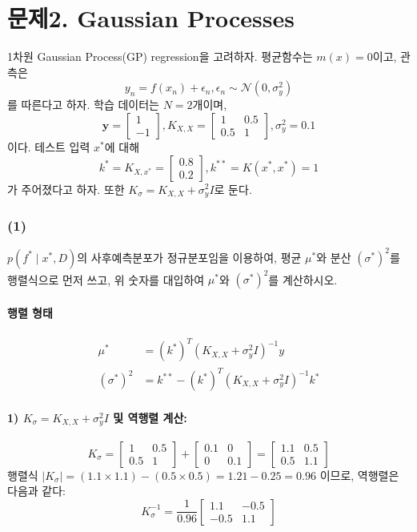 \documentclass[11pt]{article}
\begin{document}

\section*{문제2. Gaussian Processes}
1차원 Gaussian Process(GP) regression을 고려하자. 평균함수는 $m(x)=0$이고, 관측은
\[ y_n = f(x_n)+\epsilon_n, \epsilon_n \sim \mathcal{N}(0, \sigma_y^2)\]
를 따른다고 하자. 학습 데이터는 $N=2$개이며,
\[ \mathbf{y}= \begin{bmatrix} 1 \\ -1\end{bmatrix}, K_{X, X}=\begin{bmatrix} 1 & 0.5\\ 0.5 & 1\end{bmatrix}, \sigma_y^2=0.1\]
이다. 테스트 입력 $x^*$에 대해
\[ k^* = K_{X, x^*} = \begin{bmatrix} 0.8 \\ 0.2\end{bmatrix}, k^{**} = K(x^*, x^*)=1\]
가 주어졌다고 하자. 또한 $K_\sigma=K_{X, X}+\sigma_y^2I$로 둔다.

\subsubsection*{(1)}
$p(f^* \mid x^*, D)$의 사후예측분포가 정규분포임을 이용하여, 평균 $\mu^*$와 분산 $(\sigma^*)^2$를 행렬식으로 먼저 쓰고, 위 숫자를 대입하여 $\mu^*$와 $(\sigma^*)^2$를 계산하시오.
\paragraph{행렬 형태}
\begin{align*}
  \mu^* &= (k^*)^T (K_{X,X} + \sigma_y^2 I)^{-1} y \\
  (\sigma^*)^2 &= k^{**} - (k^*)^T (K_{X,X} + \sigma_y^2 I)^{-1} k^*
\end{align*}
\paragraph{1) $K_\sigma = K_{X,X} + \sigma_y^2 I$ 및 역행렬 계산:}
\[
K_\sigma = \begin{bmatrix} 1 & 0.5 \\ 0.5 & 1 \end{bmatrix} + \begin{bmatrix} 0.1 & 0 \\ 0 & 0.1 \end{bmatrix} = \begin{bmatrix} 1.1 & 0.5 \\ 0.5 & 1.1 \end{bmatrix}
\]
행렬식 $|K_\sigma| = (1.1 \times 1.1) - (0.5 \times 0.5) = 1.21 - 0.25 = 0.96$ 이므로, 역행렬은 다음과 같다:
\[
K_\sigma^{-1} = \frac{1}{0.96} \begin{bmatrix} 1.1 & -0.5 \\ -0.5 & 1.1 \end{bmatrix}
\]
\end{document}
